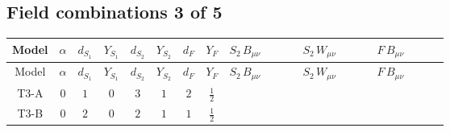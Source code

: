 \documentclass[8pt]{article}
\begin{document}
\begin{landscape}
\subsection*{Field combinations 3 of 5}
\begin{longtable}{@{}cccccccc >{\raggedright\arraybackslash}p{0.21\linewidth} >{\raggedright\arraybackslash}p{0.21\linewidth} >{\raggedright\arraybackslash}p{0.21\linewidth}@{}}
\toprule
Model & $\alpha$ & $d_{S_1}$ & $Y_{S_1}$ & $d_{S_2}$ & $Y_{S_2}$ & $d_F$ & $Y_F$ & $S_2\,B_{\mu\nu}$ & $S_2\,W_{\mu\nu}$ & $F\,B_{\mu\nu}$ \\
\midrule
\endfirsthead
\toprule
Model & $\alpha$ & $d_{S_1}$ & $Y_{S_1}$ & $d_{S_2}$ & $Y_{S_2}$ & $d_F$ & $Y_F$ & $S_2\,B_{\mu\nu}$ & $S_2\,W_{\mu\nu}$ & $F\,B_{\mu\nu}$ \\
\midrule
\endhead
T3-A & $0$ & $1$ & $0$ & $3$ & $1$ & $2$ & $\frac{1}{2}$ & \scriptsize\adjustbox{max width=\linewidth}{$\begin{gathered} -\frac{1}{4} \hbar  \log \left(\frac{\bar{\mu}^{2}}{M_{S_2}^2}\right) B_{\mu _1\mu _2}^2\end{gathered}$} & \scriptsize\adjustbox{max width=\linewidth}{$\begin{gathered} -\frac{1}{6} \hbar  \log \left(\frac{\bar{\mu}^{2}}{M_{S_2}^2}\right) \left(W_{\mu _1\mu _2}^{A_1}\right){}^2\end{gathered}$} & \scriptsize\adjustbox{max width=\linewidth}{$\begin{gathered} -\frac{1}{2} \hbar  \log \left(\frac{\bar{\mu}^{2}}{M_F^2}\right) B_{\mu _1\mu _2}^2\end{gathered}$} \\
\midrule
T3-B & $0$ & $2$ & $0$ & $2$ & $1$ & $1$ & $\frac{1}{2}$ & \scriptsize\adjustbox{max width=\linewidth}{$\begin{gathered} -\frac{1}{6} \hbar  \log \left(\frac{\bar{\mu}^{2}}{M_{S_2}^2}\right) B_{\mu _1\mu _2}^2\end{gathered}$} & \scriptsize\adjustbox{max width=\linewidth}{$\begin{gathered} -\frac{1}{24} \hbar  \log \left(\frac{\bar{\mu}^{2}}{M_{S_2}^2}\right) \left(W_{\mu _1\mu _2}^{A_1}\right){}^2\end{gathered}$} & \scriptsize\adjustbox{max width=\linewidth}{$\begin{gathered} -\frac{1}{4} \hbar  \log \left(\frac{\bar{\mu}^{2}}{M_F^2}\right) B_{\mu _1\mu _2}^2\end{gathered}$} \\
\midrule

\end{longtable}
\end{landscape}
\end{document}
